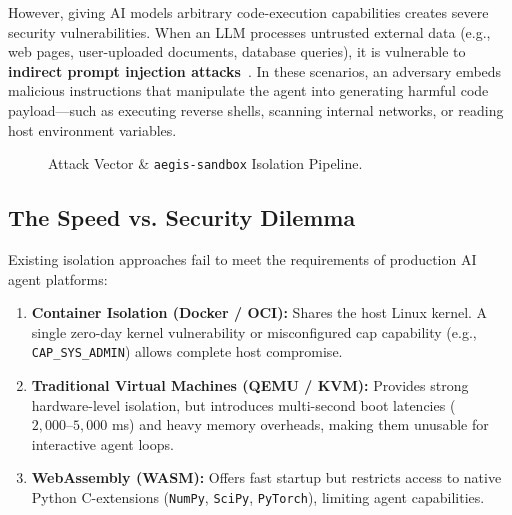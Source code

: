 \documentclass[10pt,twocolumn,a4paper]{article}
\begin{document}
However, giving AI models arbitrary code-execution capabilities creates severe security vulnerabilities. When an LLM processes untrusted external data (e.g., web pages, user-uploaded documents, database queries), it is vulnerable to \textbf{indirect prompt injection attacks}~\cite{prompt_injection}. In these scenarios, an adversary embeds malicious instructions that manipulate the agent into generating harmful code payload—such as executing reverse shells, scanning internal networks, or reading host environment variables.

\begin{figure}[h]
\centering
{}
\caption{Attack Vector & \texttt{aegis-sandbox} Isolation Pipeline.}
\label{fig:attack_pipeline}
\end{figure}

\subsection{The Speed vs. Security Dilemma}
Existing isolation approaches fail to meet the requirements of production AI agent platforms:
\begin{enumerate}
    \item \textbf{Container Isolation (Docker / OCI):} Shares the host Linux kernel. A single zero-day kernel vulnerability or misconfigured cap capability (e.g., \texttt{CAP\_SYS\_ADMIN}) allows complete host compromise.
    \item \textbf{Traditional Virtual Machines (QEMU / KVM):} Provides strong hardware-level isolation, but introduces multi-second boot latencies ($2,000\text{--}5,000$ ms) and heavy memory overheads, making them unusable for interactive agent loops.
    \item \textbf{WebAssembly (WASM):} Offers fast startup but restricts access to native Python C-extensions (\texttt{NumPy}, \texttt{SciPy}, \texttt{PyTorch}), limiting agent capabilities.
\end{enumerate}
\end{document}
